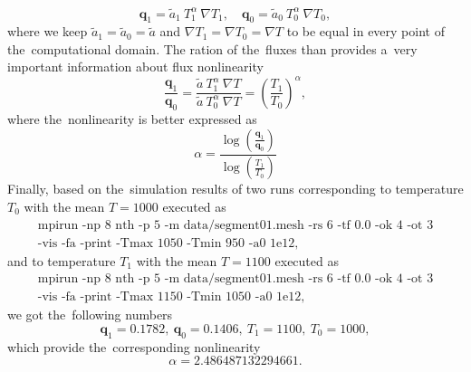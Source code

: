 \documentclass[review]{elsarticle}
\newcommand{\vect}[1]{\boldsymbol{#1}}
\begin{document}
\begin{equation}
  \vect{q}_{1} = \tilde{a}_1~T_1^{\alpha}~\nabla T_1 ,\quad 
  \vect{q}_{0} = \tilde{a}_0~T_0^{\alpha}~\nabla T_0 , 
  \nonumber 
\end{equation}
where we keep $\tilde{a}_1 = \tilde{a}_0 = \tilde{a}$ and 
$\nabla T_1 = \nabla T_0 = \nabla T$ to be equal in every point of 
the~computational domain. 
The ration of the~fluxes than provides a~very important information about
flux nonlinearity
\begin{equation}    
  \frac{\vect{q}_1}{\vect{q}_0} = 
  \frac{\tilde{a}~T_1^{\alpha}~\nabla T}{\tilde{a}~T_0^{\alpha}~\nabla T} = 
  \left( \frac{T_1}{T_0} \right)^\alpha ,
  \nonumber
\end{equation}
where the~nonlinearity is better expressed as
\begin{equation}
  \alpha = \frac{\log\left( \frac{\vect{q}_1}{\vect{q}_0} \right)}
  {\log\left( \frac{T_1}{T_0} \right)}
  \label{eq:AWBS_nonlinearity}
\end{equation}
Finally, based on the~simulation results of two runs corresponding to
temperature $T_0$ with the mean $T = 1000$ executed as
\begin{multline}
\text{mpirun -np 8 nth -p 5 -m data/segment01.mesh -rs 6 -tf 0.0 -ok 4 -ot 3} 
\\
\text{-vis -fa -print -Tmax 1050 -Tmin 950 -a0 1e12} ,
\nonumber
\end{multline}
and to temperature $T_1$ with the mean $T = 1100$ executed as
\begin{multline}
\text{mpirun -np 8 nth -p 5 -m data/segment01.mesh -rs 6 -tf 0.0 -ok 4 -ot 3} 
\\
\text{-vis -fa -print -Tmax 1150 -Tmin 1050 -a0 1e12} ,
\nonumber
\end{multline}
we got the~following numbers 
\begin{equation}
  \vect{q}_1 = 0.1782,~\vect{q}_0 = 0.1406,~T_1 = 1100,~T_0 = 1000, 
  \nonumber
\end{equation}
which provide the~corresponding nonlinearity
\begin{equation}
  \alpha = 2.486487132294661 .
  \label{eq:AWBS_nonlinearity_computed}
\end{equation}
\end{document}

